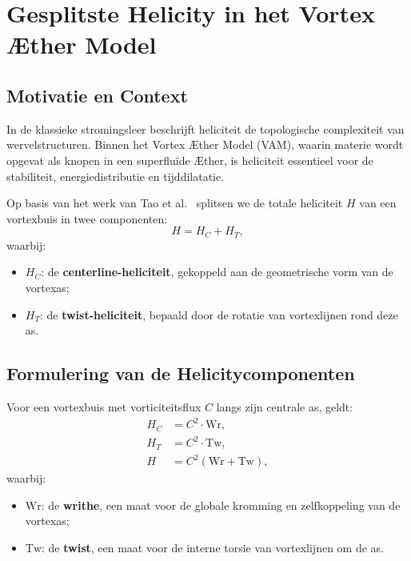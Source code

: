 
\section{Gesplitste Helicity in het Vortex Æther Model}\label{sec:appendix_10}

\subsection{Motivatie en Context}

In de klassieke stromingsleer beschrijft heliciteit de topologische complexiteit van wervelstructuren. Binnen het Vortex Æther Model (VAM), waarin materie wordt opgevat als knopen in een superfluïde Æther, is heliciteit essentieel voor de stabiliteit, energiedistributie en tijddilatatie.

Op basis van het werk van Tao et al.~\cite{Tao2021} splitsen we de totale heliciteit $H$ van een vortexbuis in twee componenten:
\begin{equation}
    H = H_C + H_T,
\end{equation}
waarbij:
\begin{itemize}
    \item $H_C$: de \textbf{centerline-heliciteit}, gekoppeld aan de geometrische vorm van de vortexas;
    \item $H_T$: de \textbf{twist-heliciteit}, bepaald door de rotatie van vortexlijnen rond deze as.
\end{itemize}

\subsection{Formulering van de Helicitycomponenten}

Voor een vortexbuis met vorticiteitsflux $C$ langs zijn centrale as, geldt:
\begin{align}
    H_C &= C^2 \cdot \text{Wr}, \\
    H_T &= C^2 \cdot \text{Tw}, \\
    H &= C^2 (\text{Wr} + \text{Tw}),
\end{align}
waarbij:
\begin{itemize}
    \item $\text{Wr}$: de \textbf{writhe}, een maat voor de globale kromming en zelfkoppeling van de vortexas;
    \item $\text{Tw}$: de \textbf{twist}, een maat voor de interne torsie van vortexlijnen om de as.
\end{itemize}

